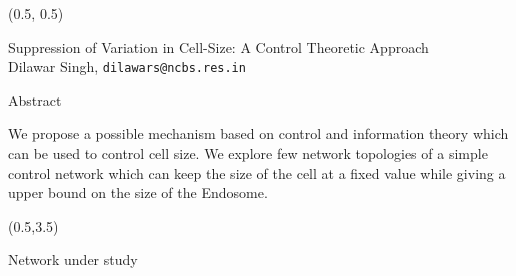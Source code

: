 \documentclass{beamer}
\begin{document}
\begin{textblock}{15}(0.5, 0.5)
    \begin{block}{}
        \centering
        \Large Suppression of Variation in Cell-Size: A Control Theoretic Approach \\
        \large Dilawar Singh, \texttt{dilawars@ncbs.res.in}
    \end{block}
    \begin{block}{Abstract}

        We propose a  possible mechanism based on control and information theory
        which can be used to control cell size. We explore few network
        topologies of a simple control network which can keep the size of the
        cell at a fixed value while giving a upper bound on the size of the
        Endosome.

\end{block}
\end{textblock}

\begin{textblock}{7}(0.5,3.5)

    \begin{block}{Network under study}

        \begin{figure}
        \begin{center}
        \end{center}
        \caption{}
        \label{fig:}
        \end{figure}

        
    \end{block}

\end{textblock}
\end{document}
